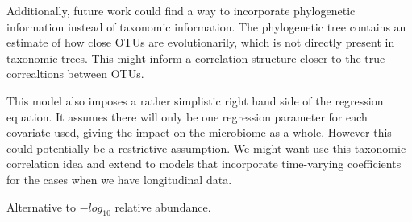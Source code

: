 \documentclass[12pt]{article}
\begin{document}
Additionally, future work could find a way to incorporate phylogenetic information instead of taxonomic information. The phylogenetic tree contains an estimate of how close OTUs are evolutionarily, which is not directly present in taxonomic trees. This might inform a correlation structure closer to the true correaltions between OTUs.

This model also imposes a rather simplistic right hand side of the regression equation. It assumes there will only be one regression parameter for each covariate used, giving the impact on the microbiome as a whole. However this could potentially be a restrictive assumption. We might want use this taxonomic correlation idea and extend to models that incorporate time-varying coefficients for the cases when we have longitudinal data.

Alternative to $-log_{10}$ relative abundance.








\begin{singlespace}
\printbibliography
\end{singlespace}
\end{document}
